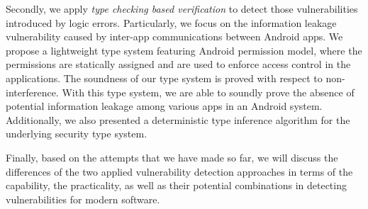 Secondly, we apply \emph{type checking based verification} to detect those vulnerabilities introduced by logic errors. Particularly, we focus on the information leakage vulnerability caused by inter-app communications between Android apps. 
We propose a lightweight type system featuring Android permission model, where the permissions are statically assigned and are used to enforce access control in the applications. 
The soundness of our type system is proved with respect to non-interference. With this type system, we are able to soundly prove the absence of potential information leakage among various apps in an Android system.
 Additionally, we also presented a deterministic type inference algorithm for the underlying security type system. 

Finally, based on the attempts that we have made so far, we will discuss the differences of the two applied vulnerability detection approaches in terms of the capability, the practicality, as well as their potential combinations in detecting vulnerabilities for modern software.

